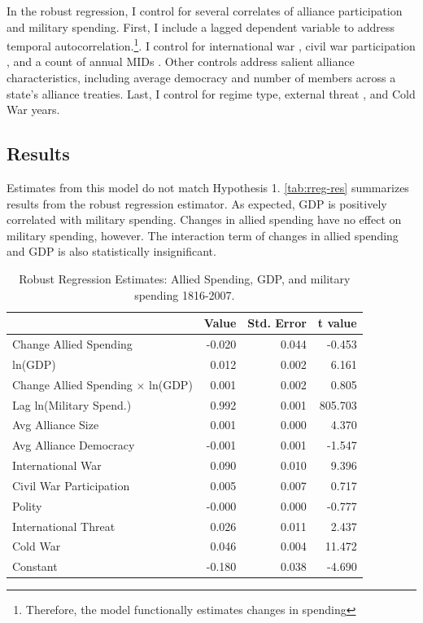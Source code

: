 \documentclass[12pt]{article}
\begin{document}
In the robust regression, I control for several correlates of alliance participation and military spending. 
First, I include a lagged dependent variable to address temporal autocorrelation.\footnote{Therefore, the model functionally estimates changes in spending}.
I control for international war \citep{Reiteretal2016}, civil war participation \citep{SarkeesWayman2010}, and a count of annual MIDs \citep{Gibleretal2016}. 
Other controls address salient alliance characteristics, including average democracy and number of members across a state's alliance treaties.   
Last, I control for regime type, external threat \cite{LeedsSavun2007}, and Cold War years. 


\subsection{Results}


Estimates from this model do not match Hypothesis 1. 
\autoref{tab:rreg-res} summarizes results from the robust regression estimator. 
As expected, GDP is positively correlated with military spending. 
Changes in allied spending have no effect on military spending, however. 
The interaction term of changes in allied spending and GDP is also statistically insignificant. 

\begin{table}[ht]
\centering
\begin{tabular}{lrrr}
  \hline
 & Value & Std. Error & t value \\ 
  \hline
	Change Allied Spending & -0.020 & 0.044 & -0.453 \\ 
	ln(GDP) & 0.012 & 0.002 & 6.161 \\ 
	Change Allied Spending $\times$ ln(GDP) & 0.001 & 0.002 & 0.805 \\ 
  Lag ln(Military Spend.) & 0.992 & 0.001 & 805.703 \\ 
  Avg Alliance Size & 0.001 & 0.000 & 4.370 \\ 
  Avg Alliance Democracy & -0.001 & 0.001 & -1.547 \\ 
  International War & 0.090 & 0.010 & 9.396 \\ 
  Civil War Participation & 0.005 & 0.007 & 0.717 \\ 
  Polity & -0.000 & 0.000 & -0.777 \\ 
  International Threat & 0.026 & 0.011 & 2.437 \\ 
  Cold War & 0.046 & 0.004 & 11.472 \\
	Constant & -0.180 & 0.038 & -4.690 \\ 
   \hline
\end{tabular}
\caption{Robust Regression Estimates: Allied Spending, GDP, and military spending 1816-2007.}
\label{tab:rreg-res}
\end{table}
\end{document}

